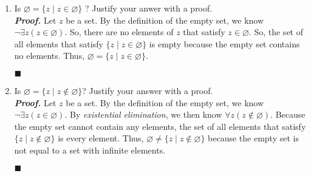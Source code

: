 \documentclass[11pt,a4paper]{article}
\begin{document}
\begin{enumerate}
\begin{enumerate}
        \item 
        Is $\varnothing = \{z \mid z \in \varnothing \}  $ ? Justify your anwer with a proof. \\
        \emph{\textbf{Proof.}} Let $z$ be a set. By the definition of the empty set, we know $\neg \exists z (z \in \varnothing) $.
        So, there are no elements of $z$ that satisfy $z \in \varnothing $. 
        So, the set of all elements that satisfy $\{z \mid z \in \varnothing \} $ is empty because the empty set contains no elements. 
        Thus, $\varnothing = \{z \mid z \in \varnothing \} $.
        \begin{flushright}
            $\blacksquare$
        \end{flushright}
        
        \item 
        Is $\varnothing = \{z \mid z \notin \varnothing \} $? Justify your answer with a proof. \\
        \emph{\textbf{Proof.}} Let $z$ be a set. By the definition of the empty set, we know $\neg \exists z (z \in \varnothing) $. By \emph{existential elimination}, we then know $\forall z (z \notin \varnothing) $. 
        Because the empty set cannot contain any elements, the set of all elements that satisfy $\{z \mid z \notin \varnothing \} $ is every element. Thus, $\varnothing \neq \{z \mid z \notin \varnothing \} $ because the empty set is not equal to a set with infinite elements. 
        \begin{flushright}
            $\blacksquare$
        \end{flushright}
    \end{enumerate}
        
\end{enumerate}
\end{document}
